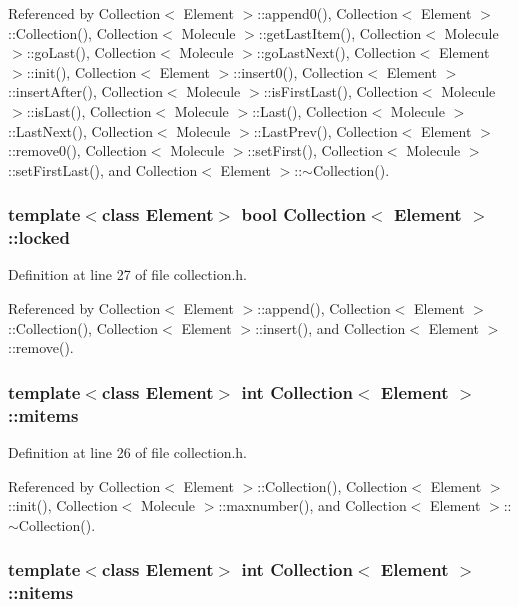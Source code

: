 Referenced by Collection$<$ Element $>$::append0(), Collection$<$ Element $>$::Collection(), Collection$<$ Molecule $>$::getLastItem(), Collection$<$ Molecule $>$::goLast(), Collection$<$ Molecule $>$::goLastNext(), Collection$<$ Element $>$::init(), Collection$<$ Element $>$::insert0(), Collection$<$ Element $>$::insertAfter(), Collection$<$ Molecule $>$::isFirstLast(), Collection$<$ Molecule $>$::isLast(), Collection$<$ Molecule $>$::Last(), Collection$<$ Molecule $>$::LastNext(), Collection$<$ Molecule $>$::LastPrev(), Collection$<$ Element $>$::remove0(), Collection$<$ Molecule $>$::setFirst(), Collection$<$ Molecule $>$::setFirstLast(), and Collection$<$ Element $>$::$\sim$Collection().\hypertarget{classCollection_1780bf38d158ceb26302c9a4956757d0}{
\subsubsection[{locked}]{\setlength{\rightskip}{0pt plus 5cm}template$<$class Element$>$ bool {\bf Collection}$<$ Element $>$::{\bf locked}}}
\label{classCollection_1780bf38d158ceb26302c9a4956757d0}




Definition at line 27 of file collection.h.

Referenced by Collection$<$ Element $>$::append(), Collection$<$ Element $>$::Collection(), Collection$<$ Element $>$::insert(), and Collection$<$ Element $>$::remove().\hypertarget{classCollection_f9021665376590331cb1f8c759b949ea}{
\subsubsection[{mitems}]{\setlength{\rightskip}{0pt plus 5cm}template$<$class Element$>$ int {\bf Collection}$<$ Element $>$::{\bf mitems}}}
\label{classCollection_f9021665376590331cb1f8c759b949ea}




Definition at line 26 of file collection.h.

Referenced by Collection$<$ Element $>$::Collection(), Collection$<$ Element $>$::init(), Collection$<$ Molecule $>$::maxnumber(), and Collection$<$ Element $>$::$\sim$Collection().\hypertarget{classCollection_df47f62cd4ec8aac331a4af10ed5e690}{
\subsubsection[{nitems}]{\setlength{\rightskip}{0pt plus 5cm}template$<$class Element$>$ int {\bf Collection}$<$ Element $>$::{\bf nitems}}}
\label{classCollection_df47f62cd4ec8aac331a4af10ed5e690}




